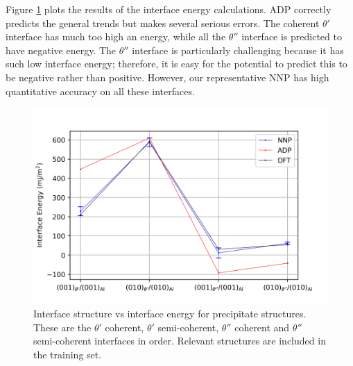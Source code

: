 \documentclass{article}
\begin{document}
Figure \ref{fig:interface_energies} plots the results of the interface energy calculations.
ADP correctly predicts the general trends but makes several serious errors.
The coherent $\theta'$ interface has much too high an energy, while all the $\theta''$ interface is predicted to have negative energy.
The $\theta''$ interface is particularly challenging because it has such low interface energy; therefore, it is easy for the potential to predict this to be negative rather than positive.
However, our representative NNP has high quantitative accuracy on all these interfaces.

\begin{figure}[H]%
\centering%
\includegraphics[width=1.2\textwidth,center]{./figures/interface_energies.png}%
\caption{Interface structure vs interface energy for precipitate structures. 
These are the $\theta'$ coherent, $\theta'$ semi-coherent, $\theta''$ coherent and $\theta''$ semi-coherent
interfaces in order. Relevant structures are included in the training set.}%
\label{fig:interface_energies}
\end{figure}
\end{document}
